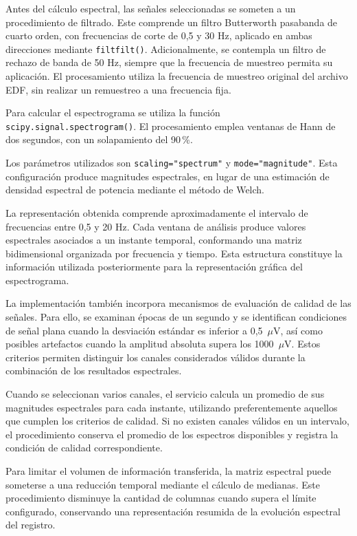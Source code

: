 Antes del cálculo espectral, las señales seleccionadas
se someten a un procedimiento de filtrado. Este comprende
un filtro Butterworth pasabanda de cuarto orden, con
frecuencias de corte de 0,5 y 30 Hz, aplicado en ambas
direcciones mediante \texttt{filtfilt()}. Adicionalmente,
se contempla un filtro de rechazo de banda de 50 Hz,
siempre que la frecuencia de muestreo permita su
aplicación. El procesamiento utiliza la frecuencia
de muestreo original del archivo EDF, sin realizar
un remuestreo a una frecuencia fija.

Para calcular el espectrograma se utiliza la función
\mbox{\texttt{scipy.signal.spectrogram()}}.
El procesamiento emplea ventanas de Hann de dos segundos,
con un solapamiento del 90\,\%.

Los parámetros utilizados son
\texttt{scaling="spectrum"} y
\texttt{mode="magnitude"}.
Esta configuración produce magnitudes espectrales,
en lugar de una estimación de densidad espectral
de potencia mediante el método de Welch.

La representación obtenida comprende aproximadamente
el intervalo de frecuencias entre 0,5 y 20 Hz. Cada
ventana de análisis produce valores espectrales
asociados a un instante temporal, conformando una
matriz bidimensional organizada por frecuencia y
tiempo. Esta estructura constituye la información
utilizada posteriormente para la representación
gráfica del espectrograma.

La implementación también incorpora mecanismos de
evaluación de calidad de las señales. Para ello,
se examinan épocas de un segundo y se identifican
condiciones de señal plana cuando la desviación
estándar es inferior a 0,5~$\mu$V, así como
posibles artefactos cuando la amplitud absoluta
supera los 1000~$\mu$V. Estos criterios
permiten distinguir los canales considerados
válidos durante la combinación de los resultados
espectrales.

Cuando se seleccionan varios canales, el servicio
calcula un promedio de sus magnitudes espectrales
para cada instante, utilizando preferentemente
aquellos que cumplen los criterios de calidad.
Si no existen canales válidos en un intervalo,
el procedimiento conserva el promedio de los
espectros disponibles y registra la condición
de calidad correspondiente.

Para limitar el volumen de información transferida,
la matriz espectral puede someterse a una reducción
temporal mediante el cálculo de medianas. Este
procedimiento disminuye la cantidad de columnas
cuando supera el límite configurado, conservando
una representación resumida de la evolución
espectral del registro.

